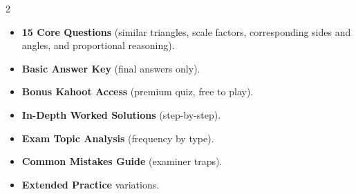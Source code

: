 \documentclass[11pt,a4paper]{article}
\newcommand{\FullReleaseDate}{April 30, 2026}
\begin{document}
\vspace{8pt}

\begin{multicols}{2}
  \begin{tcolorbox}[card, title=\sffamily\bfseries\textcolor{white}{\faHandPointDown\ TODAY (Simplified Version)}, colbacktitle=mainblue, boxed title style={sharp corners, boxrule=0pt}]
    \begin{itemize}[leftmargin=1.2em, itemsep=2pt]
      \item \small \textbf{15 Core Questions} (similar triangles, scale factors, corresponding sides and angles, and proportional reasoning).
      \item \small \textbf{Basic Answer Key} (final answers only).
      \item \small \textbf{Bonus Kahoot Access} (premium quiz, free to play).
    \end{itemize}
  \end{tcolorbox}

  \columnbreak

  \begin{tcolorbox}[card, title=\sffamily\bfseries\textcolor{white}{\faRocket\ ON \FullReleaseDate\ (Full Upgrade)}, colbacktitle=mainblue, boxed title style={sharp corners, boxrule=0pt}]
    \begin{itemize}[leftmargin=1.2em, itemsep=2pt]
      \item \small \textbf{In-Depth Worked Solutions} (step-by-step).
      \item \small \textbf{Exam Topic Analysis} (frequency by type).
      \item \small \textbf{Common Mistakes Guide} (examiner traps).
      \item \small \textbf{Extended Practice} variations.
    \end{itemize}
  \end{tcolorbox}
\end{multicols}
\end{document}

